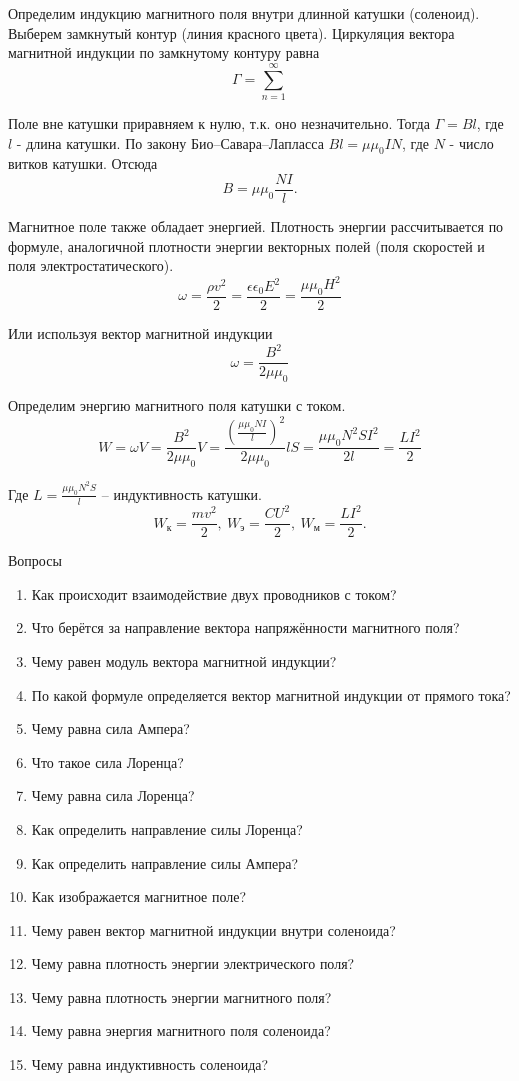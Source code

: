 \documentclass[a5paper, 10pt]{diss_4}
\renewcommand{\'}{\,'}
\begin{document}
Определим индукцию магнитного поля внутри длинной катушки (соленоид). Выберем замкнутый контур (линия красного цвета). Циркуляция вектора магнитной индукции по замкнутому контуру равна
\[
\Gamma=\sum\limits_{n=1}^{\infty}
\]

Поле вне катушки приравняем к нулю, т.к. оно незначительно. Тогда $\Gamma=Bl$, где $l$ - длина катушки. По закону Био--Савара--Лапласса  $Bl=\mu\mu_0IN$, где $N$ - число витков катушки. Отсюда
\[
B=\mu\mu_0\frac{NI}{l}.
\]

Магнитное поле также обладает энергией. Плотность энергии рассчитывается по формуле, аналогичной плотности энергии векторных полей (поля скоростей и поля электростатического).
\[
\omega=\frac{\rho v^2}{2}=\frac{\epsilon\epsilon_0E^2}{2}=\frac{\mu\mu_0H^2}{2}
\]

Или используя вектор магнитной индукции
\[
\omega=\frac{B^2}{2\mu\mu_0}
\]

Определим энергию магнитного поля катушки с током.
\[
W=\omega V=\frac{B^2}{2\mu\mu_0}V=\frac{(\frac{\mu\mu_0NI}{l})^2}{2\mu\mu_0}lS=
\frac{\mu\mu_0N^2SI^2}{2l}=\frac{LI^2}{2}
\]

Где $L=\frac{\mu\mu_0N^2S}{l} $ -- индуктивность катушки.
\[
W_к=\frac{mv^2}{2},\
W_э=\frac{CU^2}{2},\
W_м=\frac{LI^2}{2}.
\]

\begin{center}
   Вопросы
\end{center}
\begin{enumerate}
\item Как происходит взаимодействие двух проводников с током?
\item Что берётся за направление вектора напряжённости магнитного поля?
\item Чему равен модуль вектора магнитной индукции?
\item По какой формуле определяется вектор магнитной индукции от прямого тока?
\item Чему равна сила Ампера?
\item Что такое сила Лоренца?
\item Чему равна сила Лоренца?
\item Как определить направление силы Лоренца?
\item Как определить направление силы Ампера?
\item Как изображается магнитное поле?
\item Чему равен вектор магнитной индукции внутри соленоида?
\item Чему равна плотность энергии электрического поля?
\item Чему равна плотность энергии магнитного поля?
\item Чему равна энергия магнитного поля соленоида?
\item Чему равна индуктивность соленоида?
\end{enumerate}
\end{document}
